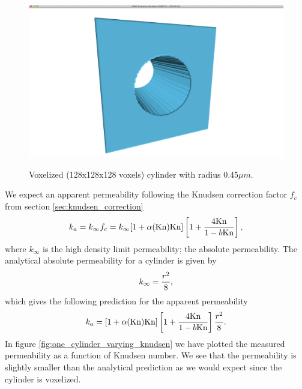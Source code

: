 \begin{figure}[h]
\begin{center}
\includegraphics[width=\textwidth, trim=0cm 0cm 0cm 0cm, clip]{DSMC/figures/cylinder.png}
\label{fig:cylinder_flow}
\end{center}
\caption{Voxelized (128x128x128 voxels) cylinder with radius $0.45\mu m$.}
\end{figure}
We expect an apparent permeability following the Knudsen correction factor $f_c$ from section \ref{sec:knudsen_correction}
\begin{align}
	k_a = k_\infty f_c = k_\infty[1 + \alpha(\text{Kn})\text{Kn}]\left[1 + {4\text{Kn}\over 1 - b\text{Kn}}\right],
\end{align}
where $k_\infty$ is the high density limit permeability; the absolute permeability. The analytical absolute permeability for a cylinder is given by\cite{karniadakis2005microflows}
\begin{align}
	\label{eq:permeability_cylinder}
	k_\infty = {r^2\over 8},
\end{align}
which gives the following prediction for the apparent permeability
\begin{align}
	k_a = [1 + \alpha(\text{Kn})\text{Kn}]\left[1 + {4\text{Kn}\over 1 - b\text{Kn}}\right] {r^2\over 8}.
\end{align}
In figure \ref{fig:one_cylinder_varying_knudsen} we have plotted the measured permeability as a function of Knudsen number. We see that the permeability is slightly smaller than the analytical prediction as we would expect since the cylinder is voxelized.

